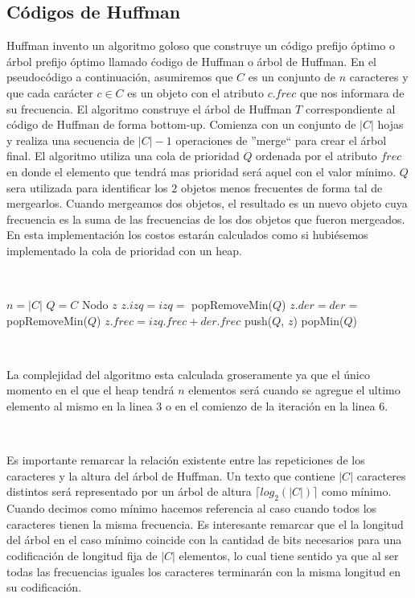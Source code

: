 \subsection{C\'odigos de Huffman}

Huffman invento un algoritmo goloso que construye un c\'odigo prefijo \'optimo o \'arbol prefijo \'optimo llamado \'codigo de Huffman o \'arbol de Huffman. En el pseudoc\'odigo a continuaci\'on, asumiremos que $C$ es un conjunto de $n$ caracteres y que cada car\'acter $c \in C$ es un objeto con el atributo $c.frec$ que nos informara de su frecuencia. El algoritmo construye el \'arbol de Huffman $T$ correspondiente al c\'odigo de Huffman de forma bottom-up. Comienza con un conjunto de $|C|$ hojas y realiza una secuencia de $|C|-1$ operaciones de ''merge`` para crear el \'arbol final. El algoritmo utiliza una cola de prioridad $Q$ ordenada por el atributo $frec$ en donde el elemento que tendr\'a mas prioridad ser\'a aquel con el valor m\'inimo. $Q$ sera utilizada para identificar los $2$ objetos menos frecuentes de forma tal de mergearlos. Cuando mergeamos dos objetos, el resultado es un nuevo objeto cuya frecuencia es la suma de las frecuencias de los dos objetos que fueron mergeados. En esta implementaci\'on
los costos estar\'an calculados como si hubi\'esemos implementado la cola de prioridad con un heap.

~

\begin{algorithmic}[1]
    \State $n = |C|$
    \State $Q = C$ 
      \State Nodo $z$
      \State $z.izq = izq = $ popRemoveMin($Q$) 
      \State $z.der = der = $ popRemoveMin($Q$) 
      \State $z.frec = izq.frec + der.frec$
      \State push($Q$, $z$) 
    \EndFor
    \State \Return popMin($Q$) 
 \EndFunction {}
\end{algorithmic}

~

La complejidad del algoritmo esta calculada groseramente ya que el \'unico momento en el que el heap tendr\'a $n$ elementos ser\'a cuando se agregue el ultimo elemento al mismo en la linea $3$ o en el comienzo de la iteraci\'on en la linea $6$.

~

Es importante remarcar la relaci\'on existente entre las repeticiones de los caracteres y la altura del \'arbol de Huffman. Un texto que contiene $|C|$ caracteres distintos ser\'a representado por un \'arbol de altura $\lceil log_2(|C|) \rceil$ como m\'inimo. Cuando decimos como m\'inimo hacemos referencia al caso cuando todos los caracteres tienen la misma frecuencia. Es interesante remarcar que el la longitud del \'arbol en el caso m\'inimo coincide con la cantidad de bits necesarios para una codificaci\'on de longitud fija de $|C|$ elementos, lo cual tiene sentido ya que al ser todas las frecuencias iguales los caracteres terminar\'an con la misma longitud en su codificaci\'on.

